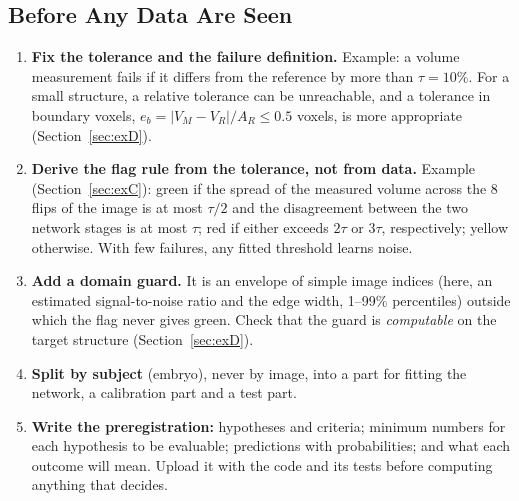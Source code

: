 \documentclass[journal,twoside]{IEEEtran}
\begin{document}
\subsection{Before Any Data Are Seen}\label{sec:before}
\begin{enumerate}
\item \textbf{Fix the tolerance and the failure definition.} Example: a volume measurement fails if it differs from
the reference by more than $\tau = 10\%$. For a small structure, a relative tolerance can be unreachable, and a
tolerance in boundary voxels, $e_b = |V_M - V_R| / A_R \le 0.5$ voxels, is more appropriate
(Section~\ref{sec:exD}).
\item \textbf{Derive the flag rule from the tolerance, not from data.} Example (Section~\ref{sec:exC}): green if the
spread of the measured volume across the 8 flips of the image is at most $\tau/2$ and the disagreement between the
two network stages is at most $\tau$; red if either exceeds $2\tau$ or $3\tau$, respectively; yellow otherwise. With
few failures, any fitted threshold learns noise.
\item \textbf{Add a domain guard.} It is an envelope of simple image indices (here, an estimated signal-to-noise
ratio and the edge width, 1--99\% percentiles) outside which the flag never gives green. Check that the guard is
\emph{computable} on the target structure (Section~\ref{sec:exD}).
\item \textbf{Split by subject} (embryo), never by image, into a part for fitting the network, a calibration part
and a test part.
\item \textbf{Write the preregistration:} hypotheses and criteria; minimum numbers for each hypothesis to be
evaluable; predictions with probabilities; and what each outcome will mean. Upload it with the code and its tests
before computing anything that decides.
\end{enumerate}
\end{document}
